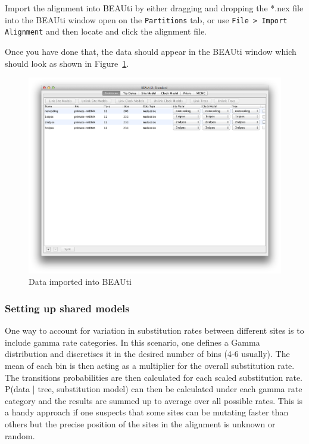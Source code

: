 \documentclass[11pt]{article}
\begin{document}
\begin{framed}
Import the alignment into BEAUti by either dragging and dropping the *.nex file into the BEAUti window open on the \texttt{Partitions} tab, or use \texttt{File > Import Alignment} and then locate and click the alignment file.
\end{framed}

Once you have done that, the data should appear in the BEAUti window which should look as shown in Figure~\ref{fig:data}.

\begin{figure}[H]
\centering
\includegraphics[width=5in]{figures/data.png}
\caption{\small Data imported into BEAUti}
\label{fig:data}
\end{figure}

\subsubsection{Setting up shared models}

One way to account for variation in substitution rates between different sites is to include gamma rate categories. In this scenario, one defines a Gamma distribution and discretises it in the desired number of bins (4-6 usually). The mean of each bin is then acting as a multiplier for the overall substitution rate. The transitions probabilities are then calculated for each scaled substitution rate. P(data | tree, substitution model) can then be calculated under each gamma rate category and the results are summed up to average over all possible rates. This is a handy approach if one suspects that some sites can be mutating faster than others but the precise position of the sites in the alignment is unknown or random.
\end{document}
